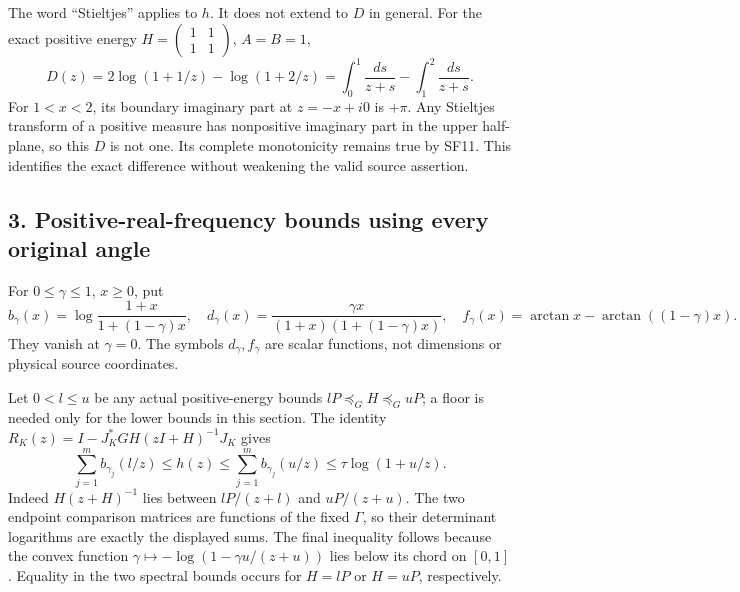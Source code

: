 \documentclass[10pt]{article}
\begin{document}
The word ``Stieltjes'' applies to \(h\). It does not extend to \(D\) in general. For the exact positive energy \(H=\left(\begin{smallmatrix}1&1\\1&1\end{smallmatrix}\right)\), \(A=B=1\), \[
 D(z)=2\log(1+1/z)-\log(1+2/z)
 =\int_0^1\frac{ds}{z+s}-\int_1^2\frac{ds}{z+s}.
 \tag{SF12}
\] For \(1<x<2\), its boundary imaginary part at \(z=-x+i0\) is \(+\pi\). Any Stieltjes transform of a positive measure has nonpositive imaginary part in the upper half-plane, so this \(D\) is not one. Its complete monotonicity remains true by SF11. This identifies the exact difference without weakening the valid source assertion.

\subsection{3. Positive-real-frequency bounds using every original angle}\label{positive-real-frequency-bounds-using-every-original-angle}

For \(0\le\gamma\le1\), \(x\ge0\), put \[
 b_\gamma(x)=\log\frac{1+x}{1+(1-\gamma)x},\quad
 d_\gamma(x)=\frac{\gamma x}{(1+x)(1+(1-\gamma)x)},\quad
 f_\gamma(x)=\arctan x-\arctan((1-\gamma)x).
 \tag{SF13}
\] They vanish at \(\gamma=0\). The symbols \(d_\gamma,f_\gamma\) are scalar functions, not dimensions or physical source coordinates.

Let \(0<l\le u\) be any actual positive-energy bounds \(lP\preceq_GH\preceq_GuP\); a floor is needed only for the lower bounds in this section. The identity \(R_K(z)=I-J_K^*GH(zI+H)^{-1}J_K\) gives \[
 \sum_{j=1}^m b_{\gamma_j}(l/z)
 \le h(z)\le\sum_{j=1}^m b_{\gamma_j}(u/z)
 \le\tau\log(1+u/z).
 \tag{SF14}
\] Indeed \(H(z+H)^{-1}\) lies between \(lP/(z+l)\) and \(uP/(z+u)\). The two endpoint comparison matrices are functions of the fixed \(\Gamma\), so their determinant logarithms are exactly the displayed sums. The final inequality follows because the convex function \(\gamma\mapsto-\log(1-\gamma u/(z+u))\) lies below its chord on \([0,1]\). Equality in the two spectral bounds occurs for \(H=lP\) or \(H=uP\), respectively.
\end{document}
